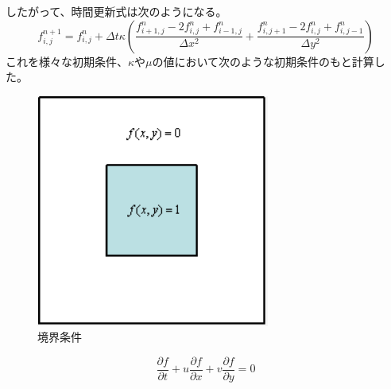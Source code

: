 \documentclass[a4paper,dvipdfmx]{jsarticle}%
\begin{document}
  したがって、時間更新式は次のようになる。
  \begin{equation}
    f_{i,j}^{n+1} = f_{i,j}^n + \Delta t \kappa \left( \dfrac{f_{i+1,j}^n - 2f_{i,j}^n + f_{i-1,j}^n}{\Delta x^2} + \dfrac{f_{i,j+1}^n - 2f_{i,j}^n + f_{i,j-1}^n}{\Delta y^2} \right)
  \end{equation}
  これを様々な初期条件、\(\kappa\)や\(\mu\)の値において次のような初期条件のもと計算した。
  \begin{figure}[H]%
    \centering
    \includegraphics[width=0.4\columnwidth]{boundary.png}
    \caption{境界条件}
    \label{boundary}
  \end{figure}%

  \begin{equation}
    \dfrac{\partial f}{\partial t} + u\dfrac{\partial f}{\partial x} + v\dfrac{\partial f}{\partial y} = 0
  \end{equation}
\end{document}
